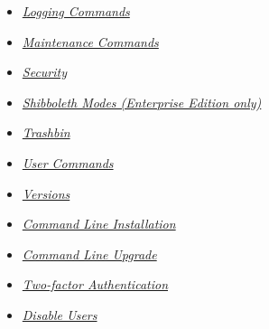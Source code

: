 \documentclass[letterpaper,10pt,english]{sphinxmanual}
\begin{document}
\begin{itemize}
\item {} 
{\hyperref[configuration_server/occ_command:logging-commands-label]{\emph{Logging Commands}}}

\item {} 
{\hyperref[configuration_server/occ_command:maintenance-commands-label]{\emph{Maintenance Commands}}}

\item {} 
{\hyperref[configuration_server/occ_command:security-commands-label]{\emph{Security}}}

\item {} 
{\hyperref[configuration_server/occ_command:shibboleth-label]{\emph{Shibboleth Modes (Enterprise Edition only)}}}

\item {} 
{\hyperref[configuration_server/occ_command:trashbin-label]{\emph{Trashbin}}}

\item {} 
{\hyperref[configuration_server/occ_command:user-commands-label]{\emph{User Commands}}}

\item {} 
{\hyperref[configuration_server/occ_command:versions-label]{\emph{Versions}}}

\item {} 
{\hyperref[configuration_server/occ_command:command-line-installation-label]{\emph{Command Line Installation}}}

\item {} 
{\hyperref[configuration_server/occ_command:command-line-upgrade-label]{\emph{Command Line Upgrade}}}

\item {} 
{\hyperref[configuration_server/occ_command:two-factor-auth-label]{\emph{Two-factor Authentication}}}

\item {} 
{\hyperref[configuration_server/occ_command:disable-user-label]{\emph{Disable Users}}}

\end{itemize}
\end{document}
